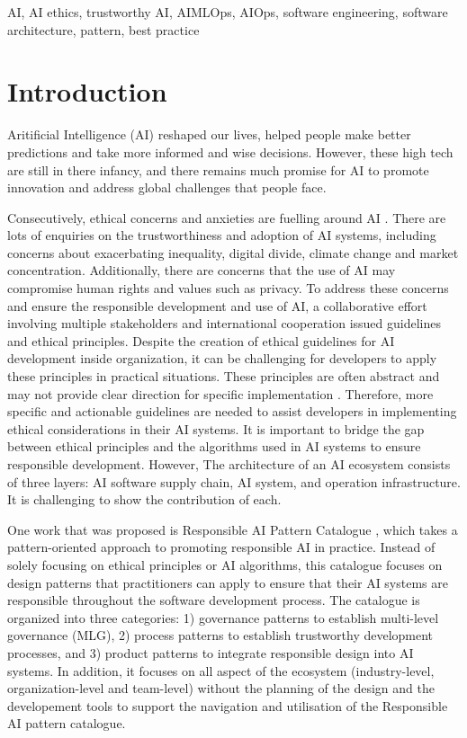 \documentclass[conference]{IEEEtran}
\begin{document}
\begin{IEEEkeywords}
AI, AI ethics, trustworthy AI, AIMLOps, AIOps, software engineering, software architecture, pattern, best practice
\end{IEEEkeywords}

\section{Introduction}
Aritificial Intelligence (AI) reshaped our lives, helped people make better predictions and take more informed and wise decisions. However, these high tech are still in there infancy, and there remains much promise for AI to promote innovation and address global challenges that people face.

Consecutively, ethical concerns and anxieties are fuelling around AI \cite{DBLP}. There are lots of enquiries on the trustworthiness and adoption of AI systems, including concerns about exacerbating inequality, digital divide, climate change and market concentration. Additionally, there are concerns that the use of AI may compromise human rights and values such as privacy. To address these concerns and ensure the responsible development and use of AI, a collaborative effort involving multiple stakeholders and international cooperation issued guidelines and ethical principles. Despite the creation of ethical guidelines for AI development inside organization, it can be challenging for developers to apply these principles in practical situations. These principles are often abstract and may not provide clear direction for specific implementation \cite{abs-2111-09478}. Therefore, more specific and actionable guidelines are needed to assist developers in implementing ethical considerations in their AI systems. It is important to bridge the gap between ethical principles and the algorithms used in AI systems to ensure responsible development. However, The architecture of an AI ecosystem consists of three layers: AI software supply chain, AI system, and operation infrastructure. It is challenging to show the contribution of each.

One work that was proposed is Responsible AI Pattern Catalogue \cite{catalogue}, which takes a pattern-oriented approach to promoting responsible AI in practice. Instead of solely focusing on ethical principles or AI algorithms, this catalogue focuses on design patterns that practitioners can apply to ensure that their AI systems are responsible throughout the software development process. The catalogue is organized into three categories: 1) governance patterns to establish multi-level governance (MLG), 2) process patterns to establish trustworthy development processes, and 3) product patterns to integrate responsible design into AI systems. In addition, it focuses on all aspect of the ecosystem (industry-level, organization-level and team-level) without the planning of the design and the developement tools to support the navigation and utilisation of the Responsible AI pattern catalogue.
\end{document}
